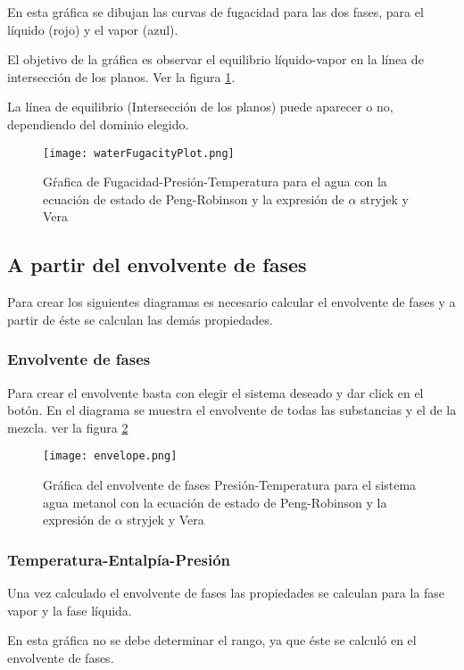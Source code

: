 		En esta gráfica se dibujan las curvas de fugacidad para las dos fases, para el líquido (rojo) y el vapor (azul).

		El objetivo de la gráfica es observar el equilibrio líquido-vapor en la línea de intersección de los planos. Ver la figura \ref{fig:fugplot}.

		La línea de equilibrio (Intersección de los planos) puede aparecer o no, dependiendo del dominio elegido.

		\begin{figure}[H]
			\texttt{[image: waterFugacityPlot.png]}
			\caption{Gŕafica de Fugacidad-Presión-Temperatura para el agua con la ecuación de estado de Peng-Robinson y la expresión de $\alpha$ stryjek y Vera}
			\label{fig:fugplot}
		\end{figure}

	\subsection{A partir del envolvente de fases}\label{subsec:envelope}
		Para crear los siguientes diagramas es necesario calcular el envolvente de fases y a partir de éste se calculan las demás propiedades.

	\subsubsection{Envolvente de fases}
		Para crear el envolvente basta con elegir el sistema deseado y dar click en el botón. En el diagrama se muestra el envolvente de todas las substancias y el de la mezcla. ver la figura \ref{fig:envelope}
		\begin{figure}[H]
			\texttt{[image: envelope.png]}
			\caption{Gráfica del envolvente de fases Presión-Temperatura para el sistema  agua metanol con la ecuación de estado de Peng-Robinson y la expresión de $\alpha$ stryjek y Vera}
			\label{fig:envelope}
		\end{figure}

	\subsubsection{Temperatura-Entalpía-Presión}\label{subsec:tep}
		Una vez calculado el envolvente de fases las propiedades se calculan para la fase vapor y la fase líquida.

		En esta gráfica no se debe determinar el rango, ya que éste se calculó en el envolvente de fases.

